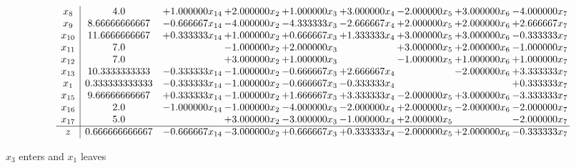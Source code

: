 \documentclass[10pt]{article}
\begin{document}
 \[\begin{array}{c| c c@{\hskip 2pt} c@{\hskip 2pt} c@{\hskip 2pt} c@{\hskip 2pt} c@{\hskip 2pt} c@{\hskip 2pt} c@{\hskip 2pt} }
 x_{8}   &  4.0 & + 1.000000 x_{14} & + 2.000000 x_{2} & + 1.000000 x_{3} & + 3.000000 x_{4} & -2.000000 x_{5} & + 3.000000 x_{6} & -4.000000 x_{7}\\
 x_{9}   &  8.66666666667 & -0.666667 x_{14} & -4.000000 x_{2} & -4.333333 x_{3} & -2.666667 x_{4} & + 2.000000 x_{5} & + 2.000000 x_{6} & + 2.666667 x_{7}\\
 x_{10}   &  11.6666666667 & + 0.333333 x_{14} & + 1.000000 x_{2} & + 0.666667 x_{3} & + 1.333333 x_{4} & + 3.000000 x_{5} & + 3.000000 x_{6} & -0.333333 x_{7}\\
 x_{11}   &  7.0  &   & -1.000000 x_{2} & + 2.000000 x_{3} &   & + 3.000000 x_{5} & + 2.000000 x_{6} & -1.000000 x_{7}\\
 x_{12}   &  7.0  &   & + 3.000000 x_{2} & + 1.000000 x_{3} &   & -1.000000 x_{5} & + 1.000000 x_{6} & + 1.000000 x_{7}\\
 x_{13}   &  10.3333333333 & -0.333333 x_{14} & -1.000000 x_{2} & -0.666667 x_{3} & + 2.666667 x_{4} &   & -2.000000 x_{6} & + 3.333333 x_{7}\\
 x_{1}   &  0.333333333333 & -0.333333 x_{14} & -1.000000 x_{2} & -0.666667 x_{3} & -0.333333 x_{4} &    &   & + 0.333333 x_{7}\\
 x_{15}   &  9.66666666667 & + 0.333333 x_{14} & -1.000000 x_{2} & + 1.666667 x_{3} & + 3.333333 x_{4} & -2.000000 x_{5} & + 3.000000 x_{6} & -3.333333 x_{7}\\
 x_{16}   &  2.0 & -1.000000 x_{14} & -1.000000 x_{2} & -4.000000 x_{3} & -2.000000 x_{4} & + 2.000000 x_{5} & -2.000000 x_{6} & -2.000000 x_{7}\\
 x_{17}   &  5.0  &   & + 3.000000 x_{2} & -3.000000 x_{3} & -1.000000 x_{4} & + 2.000000 x_{5} &   & -2.000000 x_{7}\\
\hline
z    &  0.666666666667 & -0.666667 x_{14} & -3.000000 x_{2} & + 0.666667 x_{3} & + 0.333333 x_{4} & -2.000000 x_{5} & + 2.000000 x_{6} & -0.333333 x_{7}\\
\end{array}\]


 $ x_{3} $ enters and $ x_{1} $ leaves 
\end{document}
